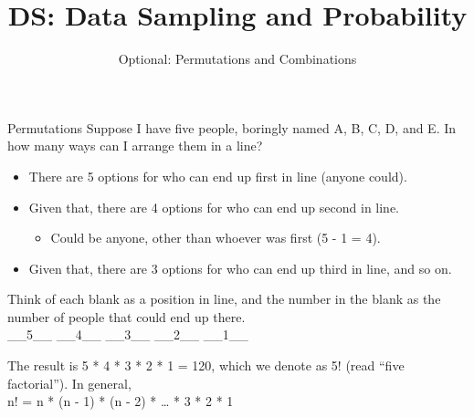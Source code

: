 \documentclass[aspectratio=169]{../latex_main/tntbeamer}  %
\title[Optional Permutations]{DS: Data Sampling and Probability}
\subtitle{Optional: Permutations and Combinations}
\begin{document}
	
	\maketitle
	

	\begin{frame}{Permutations}
	    Suppose I have five people, boringly named A, B, C, D, and E. In how many ways can I arrange them in a line?
	    \begin{itemize}
	        \item There are 5 options for who can end up first in line (anyone could).
	        \item Given that, there are 4 options for who can end up second in line.
	        \begin{itemize}
	            \item Could be anyone, other than whoever was first (5 - 1 = 4).
	        \end{itemize}
	        \item Given that, there are 3 options for who can end up third in line, and so on.
	    \end{itemize}
	    	       
	       Think of each blank as a position in line, and the number in the blank as the number of people that could end up there.\\
	       
	       \_\_5\_\_ \hspace{2cm}		\_\_4\_\_ \hspace{2cm}		\_\_3\_\_ \hspace{2cm}		\_\_2\_\_	 \hspace{2cm}	\_\_1\_\_

        The result is 5 * 4 * 3 * 2 * 1 = 120, which we denote as 5! (read “five factorial”). In general,\\
        \hspace{4cm} n! = n * (n - 1) * (n - 2) * … * 3 * 2 * 1


	\end{frame}
	
\end{document}
